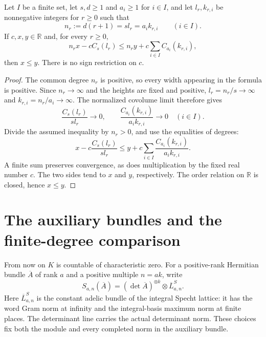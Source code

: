 \begin{lemma}
\label{lem:specht-error-limit}
\leanok
Let $I$ be a finite set, let $s,d\geq1$ and $a_i\geq1$ for $i\in I$,
and let $l_r,k_{r,i}$ be nonnegative integers for $r\geq0$ such that
\[
 n_r:=d(r+1)=s l_r=a_i k_{r,i}\qquad(i\in I).
\]
If $c,x,y\in\mathbb R$ and, for every $r\geq0$,
\[
 n_r x-cC_s(l_r)\leq n_r y+c\sum_{i\in I}C_{a_i}(k_{r,i}),
\]
then $x\leq y$. There is no sign restriction on $c$.
\end{lemma}
\begin{proof}
The common degree $n_r$ is positive, so every width appearing in the formula
is positive. Since $n_r\to\infty$ and the heights are fixed and positive,
$l_r=n_r/s\to\infty$ and $k_{r,i}=n_r/a_i\to\infty$.
The normalized covolume limit therefore gives
\[
 \frac{C_s(l_r)}{s l_r}\longrightarrow0,
 \qquad
 \frac{C_{a_i}(k_{r,i})}{a_i k_{r,i}}\longrightarrow0
 \quad(i\in I).
\]
Divide the assumed inequality by $n_r>0$, and use the equalities of degrees:
\[
 x-c\frac{C_s(l_r)}{s l_r}
 \leq y+c\sum_{i\in I}\frac{C_{a_i}(k_{r,i})}{a_i k_{r,i}}.
\]
A finite sum preserves convergence, as does multiplication by the fixed real
number $c$. The two sides tend to $x$ and $y$, respectively. The order relation
on $\mathbb R$ is closed, hence $x\leq y$.
\end{proof}

\section{The auxiliary bundles and the finite-degree comparison}

From now on $K$ is countable of characteristic zero.
For a positive-rank Hermitian bundle $\overline A$ of rank $a$ and a positive
multiple $n=ak$, write
\[
 S_{a,n}(\overline A)
   =(\det\overline A)^{\otimes k}\otimes\overline L^S_{a,n}.
\]
Here $\overline L^S_{a,n}$ is the constant adelic bundle of the integral Specht
lattice: it has the word Gram norm at infinity and the integral-basis maximum
norm at finite places. The determinant line carries the actual determinant
norm. These choices fix both the module and every completed norm in the
auxiliary bundle.

